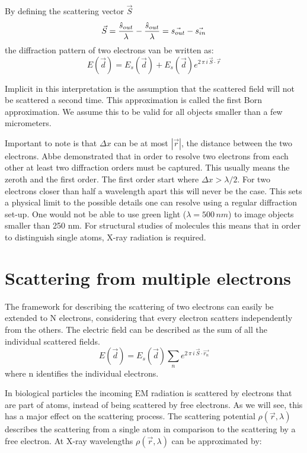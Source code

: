By defining the scattering vector $\vec{S}$
\begin{equation}\label{eq:ScatteringVector}
\vec{S} = \frac{\hat{s}_{out}}{\lambda} - \frac{\hat{s}_{out}}{\lambda}\\ = \vec{s_{out}}-\vec{s_{in}}
\end{equation}
the diffraction pattern of two electrons van be written as:
\begin{equation}
E(\vec{d}) = E_s(\vec{d}) + E_s(\vec{d}) e^{2\,\pi\,  i\,\vec{S}\cdot\vec{r}}
\end{equation}

Implicit in this interpretation is the assumption that the scattered field will not be scattered a second time. This approximation is called the first Born approximation. We assume this to be valid for all objects smaller than a few micrometers.

Important to note is that $\Delta x $ can be at most $|\vec{r}|$, the distance between the two electrons. Abbe demonstrated that in order to resolve two electrons from each other at least two diffraction orders must be captured. This usually means the zeroth and the first order. The first order start where $\Delta x > \lambda/2$. For two electrons closer than half a wavelength apart this will never be the case. This sets a physical limit to the possible details one can resolve using a regular diffraction set-up. One would not be able to use green light ($\lambda = 500\,nm$) to image objects smaller than 250 nm. For structural studies of molecules this means that in order to distinguish single atoms, X-ray radiation is required.

\section{Scattering from multiple electrons}
The framework for describing the scattering of two electrons can easily be extended to N electrons, considering that every electron scatters independently from the others. The electric field can be described as the sum of all the individual scattered fields.
\begin{equation}\label{eq:boehoe}
E(\vec{d}) = E_s(\vec{d}) \sum_{n} e^{2\,\pi\,  i\,\vec{S}\cdot\vec{r_n}}
\end{equation}
where n identifies the individual electrons.

In biological particles the incoming EM radiation is scattered by electrons that are part of atoms, instead of being scattered by free electrons. As we will see, this has a major effect on the scattering process. The scattering potential $\rho(\vec{r},\lambda)$ describes the scattering from a single atom in comparison to the scattering by a free electron. At X-ray wavelengths $\rho(\vec{r},\lambda)$ can be approximated by:

